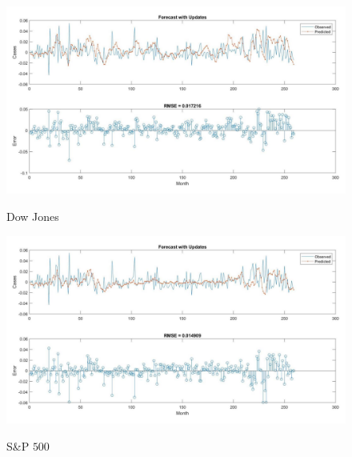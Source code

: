 \documentclass[12pt]{article}
\begin{document}
    \begin{minipage}{0.5\textwidth}
        \begin{figure}[H]
            \centering
            \caption{Dow Jones}
            \includegraphics[scale=0.28]{../shreya/lstm2.pdf}
            \label{fig:LSTM-shreya-2}
        \end{figure}
    \end{minipage}
    \begin{minipage}{0.5\textwidth}
        \begin{figure}[H]
            \centering
            \caption{S\&P $500$}
            \includegraphics[scale=0.28]{../shreya/lstm5.pdf}
            \label{fig:LSTM-shreya-5}
        \end{figure}
    \end{minipage}
\end{document}
